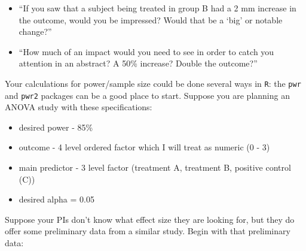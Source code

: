 \documentclass[
]{book}
\providecommand{\tightlist}{%
  \setlength{\itemsep}{0pt}\setlength{\parskip}{0pt}}
\begin{document}
\begin{itemize}
\tightlist
\item
  ``If you saw that a subject being treated in group B had a 2 mm increase in the outcome, would you be impressed? Would that be a `big' or notable change?''
\item
  ``How much of an impact would you need to see in order to catch you attention in an abstract? A 50\% increase? Double the outcome?''
\end{itemize}

Your calculations for power/sample size could be done several ways in \texttt{R}: the \texttt{pwr} and \texttt{pwr2} packages can be a good place to start. Suppose you are planning an ANOVA study with these specifications:

\begin{itemize}
\tightlist
\item
  desired power - 85\%
\item
  outcome - 4 level ordered factor which I will treat as numeric (0 - 3)
\item
  main predictor - 3 level factor (treatment A, treatment B, positive control (C))
\item
  desired alpha = 0.05
\end{itemize}

Suppose your PIs don't know what effect size they are looking for, but they do offer some preliminary data from a similar study. Begin with that preliminary data:
\end{document}
